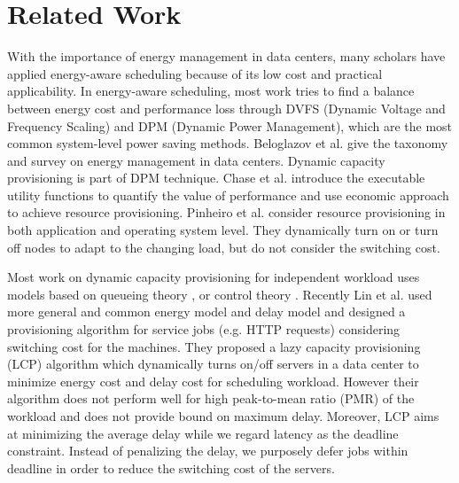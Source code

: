 \documentclass[10pt,conference,compsocconf,letterpaper]{IEEEtran}
\begin{document}
\section{Related Work}
With the importance of energy management in data centers, many scholars have applied energy-aware scheduling because of its low cost and practical applicability. In energy-aware scheduling, most work tries to find a balance between energy cost and performance loss through DVFS (Dynamic Voltage and Frequency Scaling) and DPM (Dynamic Power Management), which are the most common system-level power saving methods.  Beloglazov et al. \cite{1} give the taxonomy and survey on energy management in data centers. Dynamic capacity provisioning is part of DPM technique.  Chase et al. \cite{2} introduce the executable utility functions to quantify the value of performance and use economic approach to achieve resource provisioning.  Pinheiro et al. \cite{3} consider resource provisioning in both application and operating system level. They dynamically turn on or turn off nodes to adapt to the changing load, but do not consider the switching cost.

Most work on dynamic capacity provisioning for independent workload uses models based on queueing theory \cite{4,8}, or control theory \cite{7,29}. Recently Lin et al. \cite{9} used more general and common energy model and delay model and designed a provisioning algorithm for service jobs (e.g. HTTP requests) considering switching cost for the machines. They proposed a lazy capacity provisioning (LCP) algorithm which dynamically turns on/off servers in a data center to minimize energy cost and delay cost for scheduling workload. However their algorithm does not perform well for high peak-to-mean ratio (PMR) of the workload and does not provide bound on maximum delay. Moreover, LCP aims at minimizing the average delay while we regard latency as the deadline constraint. Instead of penalizing the delay, we purposely defer jobs within deadline in order to reduce the switching cost of the servers.
\end{document}
